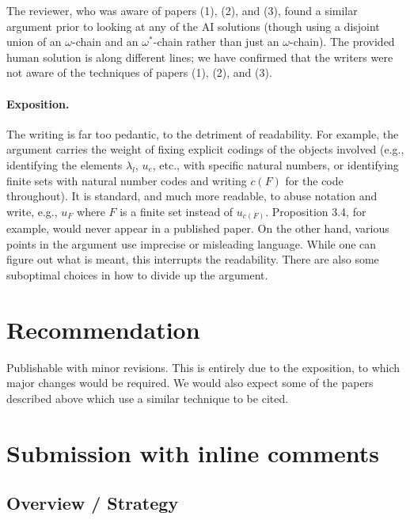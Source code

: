 \documentclass[12pt]{article}
\theoremstyle{definition}
\theoremstyle{remark}
\begin{document}
The reviewer, who was aware of papers (1), (2), and (3), found a similar argument prior to looking at any of the AI solutions (though using a disjoint union of an $\omega$-chain and an $\omega^*$-chain rather than just an $\omega$-chain). The provided human solution is along different lines; we have confirmed that the writers were not aware of the techniques of papers (1), (2), and (3). 

\paragraph{Exposition.} The writing is far too pedantic, to the detriment of readability. For example, the argument carries the weight of fixing explicit codings of the objects involved (e.g., identifying the elements $\lambda_l$, $u_e$, etc., with specific natural numbers, or identifying finite sets with natural number codes and writing $c(F)$ for the code throughout). It is standard, and much more readable, to abuse notation and write, e.g., $u_F$ where $F$ is a finite set instead of $u_{c(F)}$. Proposition 3.4, for example, would never appear in a published paper. On the other hand, various points in the argument use imprecise or misleading language. While one can figure out what is meant, this interrupts the readability. There are also some suboptimal choices in how to divide up the argument.

\section{Recommendation}

Publishable with minor revisions. This is entirely due to the exposition, to which major changes would be required. We would also expect some of the papers described above which use a similar technique to be cited.

  \section{Submission with inline comments}


\date{}


\subsection*{Overview / Strategy}
\end{document}

